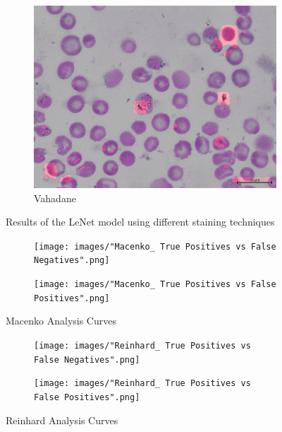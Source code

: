 \documentclass{nitk}
\begin{document}
\begin{figure}
\begin{subfigure}{0.3\textwidth}
    \includegraphics[width=\linewidth]{images/vahadane_0a747cb3-c720-4572-a661-ab5670a5c42e.png}
    \caption{Vahadane}
    \end{subfigure} \hfill
    \caption{Results of the LeNet model using different staining techniques}
\end{figure}

\begin{figure}
    \centering
    \begin{subfigure}{0.45\textwidth}
    \centering
    \texttt{[image: images/"Macenko\_ True Positives vs False Negatives".png]}
    \end{subfigure} \hfill
    \begin{subfigure}{0.45\textwidth}
    \centering
    \texttt{[image: images/"Macenko\_ True Positives vs False Positives".png]}
    \end{subfigure}
    \caption{Macenko Analysis Curves}
    \label{fig:macenko_curves}
\end{figure}

\begin{figure}
    \centering
    \begin{subfigure}{0.45\textwidth}
    \centering
    \texttt{[image: images/"Reinhard\_ True Positives vs False Negatives".png]}
    \end{subfigure} \hfill
    \begin{subfigure}{0.45\textwidth}
    \centering
    \texttt{[image: images/"Reinhard\_ True Positives vs False Positives".png]}
    \end{subfigure}
    \caption{Reinhard Analysis Curves}
    \label{fig:macenko_curves}
\end{figure}
\end{document}
